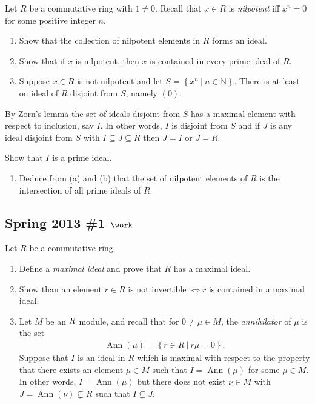 Let \(R\) be a commutative ring with \(1\neq 0\). Recall that \(x\in R\)
is \emph{nilpotent} iff \(x^n = 0\) for some positive integer \(n\).

\begin{enumerate}
\def\labelenumi{\alph{enumi}.}
\item
  Show that the collection of nilpotent elements in \(R\) forms an
  ideal.
\item
  Show that if \(x\) is nilpotent, then \(x\) is contained in every
  prime ideal of \(R\).
\item
  Suppose \(x\in R\) is not nilpotent and let
  \(S = \left\{{x^n {~\mathrel{\Big|}~}n\in {\mathbb{N}}}\right\}\).
  There is at least on ideal of \(R\) disjoint from \(S\), namely
  \((0)\).
\end{enumerate}

By Zorn's lemma the set of ideals disjoint from \(S\) has a maximal
element with respect to inclusion, say \(I\). In other words, \(I\) is
disjoint from \(S\) and if \(J\) is any ideal disjoint from \(S\) with
\(I\subseteq J \subseteq R\) then \(J=I\) or \(J=R\).

Show that \(I\) is a prime ideal.

\begin{enumerate}
\def\labelenumi{\alph{enumi}.}
\setcounter{enumi}{3}
\tightlist
\item
  Deduce from (a) and (b) that the set of nilpotent elements of \(R\) is
  the intersection of all prime ideals of \(R\).
\end{enumerate}

\hypertarget{spring-2013-1-work}{%
\subsection{\texorpdfstring{Spring 2013 \#1
\(\work\)}{Spring 2013 \#1 \textbackslash work}}\label{spring-2013-1-work}}

Let \(R\) be a commutative ring.

\begin{enumerate}
\def\labelenumi{\alph{enumi}.}
\item
  Define a \emph{maximal ideal} and prove that \(R\) has a maximal
  ideal.
\item
  Show than an element \(r\in R\) is not invertible \(\iff r\) is
  contained in a maximal ideal.
\item
  Let \(M\) be an \(R{\hbox{-}}\)module, and recall that for
  \(0\neq \mu \in M\), the \emph{annihilator} of \(\mu\) is the set
  \begin{align*}
  \operatorname{Ann}(\mu) = \left\{{r\in R {~\mathrel{\Big|}~}r\mu = 0}\right\}
  .\end{align*}
  Suppose that \(I\) is an ideal in \(R\) which is maximal with respect
  to the property that there exists an element \(\mu \in M\) such that
  \(I = \operatorname{Ann}(\mu)\) for some \(\mu \in M\). In other
  words, \(I = \operatorname{Ann}(\mu)\) but there does not exist
  \(\nu\in M\) with \(J = \operatorname{Ann}(\nu) \subsetneq R\) such
  that \(I\subsetneq J\).
\end{enumerate}

